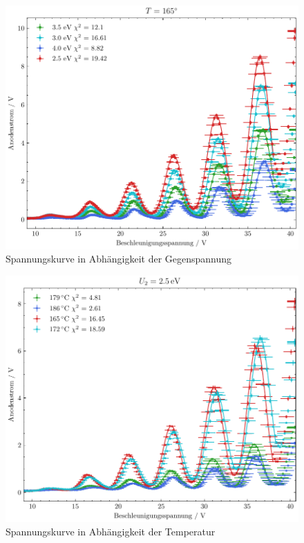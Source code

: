 \begin{figure}[htb]
    \centering
    \includegraphics[width=0.6\linewidth]{../figs/franck-hertz_gegenspannung}
    \caption{Spannungskurve in Abhängigkeit der Gegenspannung}
    \label{fig:gegenspannung}
\end{figure}

\begin{figure}[htb]
    \centering
    \includegraphics[width=0.6\linewidth]{../figs/franck-hertz_temperatur}
    \caption{Spannungskurve in Abhängigkeit der Temperatur}
    \label{fig:temperatur}
\end{figure}